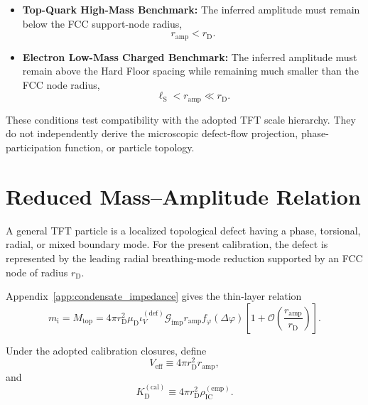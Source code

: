 \begin{itemize}
    \item \textbf{Top-Quark High-Mass Benchmark:}
    The inferred amplitude must remain below the FCC support-node radius,
    \begin{equation}
        r_{\mathrm{amp}} < r_{\mathrm{D}}.
    \end{equation}

    \item \textbf{Electron Low-Mass Charged Benchmark:}
    The inferred amplitude must remain above the Hard Floor spacing while remaining much smaller than the FCC node radius,
    \begin{equation}
        \ell_{\mathrm{S}} < r_{\mathrm{amp}} \ll r_{\mathrm{D}}.
    \end{equation}
\end{itemize}

These conditions test compatibility with the adopted TFT scale hierarchy. They do not independently derive the microscopic defect-flow projection, phase-participation function, or particle topology.

\section{Reduced Mass--Amplitude Relation}

A general TFT particle is a localized topological defect having a phase, torsional, radial, or mixed boundary mode. For the present calibration, the defect is represented by the leading radial breathing-mode reduction supported by an FCC node of radius $r_{\mathrm{D}}$.

Appendix~\ref{app:condensate_impedance} gives the thin-layer relation
\begin{equation}
    m_{\mathrm{i}} = M_{\mathrm{top}} = 4\pi r_{\mathrm{D}}^2 \mu_{\mathrm{D}} \iota_V^{(\mathrm{def})} \mathcal{G}_{\mathrm{imp}} r_{\mathrm{amp}} f_{\varphi}(\Delta\varphi) \left[ 1 + \mathcal{O} \left( \frac{r_{\mathrm{amp}}}{r_{\mathrm{D}}} \right) \right].
\end{equation}

Under the adopted calibration closures, define
\begin{equation}
    V_{\mathrm{eff}} \equiv 4\pi r_{\mathrm{D}}^2 r_{\mathrm{amp}},
\end{equation}
and
\begin{equation}
    K_{\mathrm{D}}^{(\mathrm{cal})} \equiv 4\pi r_{\mathrm{D}}^2 \rho_{\mathrm{IC}}^{(\mathrm{emp})}.
\end{equation}

